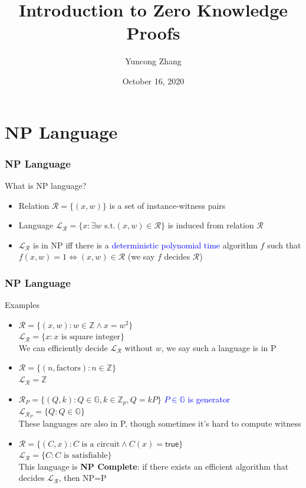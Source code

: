 \documentclass[handout]{beamer} %
\title{Introduction to Zero Knowledge Proofs}
\author{Yuncong Zhang}
\date{October 16, 2020}
\newcommand{\blue}[1]{\textcolor{blue}{#1}}
\newcommand{\dgreen}[1]{\textcolor{dgreen}{#1}}
\begin{document}
\frame{\titlepage}

\section[Outline]{}

\section{NP Language}
\frame
{
  \frametitle{NP Language}
  \onslide<+-> What is NP language?
  \begin{itemize}
    \item<+-> Relation $\mathcal{R}=\{(x,w)\}$ is a set of instance-witness pairs
    \item<+-> Language $\mathcal{L}_\mathcal{R}=\{x:\exists w \text{ s.t.} (x,w)\in\mathcal{R}\}$ is induced from relation $\mathcal{R}$
    \item<+-> $\mathcal{L}_{\mathcal{R}}$ is in NP iff there is a \blue{deterministic polynomial time} algorithm $f$ such that $f(x,w)=1\Leftrightarrow (x,w)\in\mathcal{R}$ (we say $f$ decides $\mathcal{R}$)
  \end{itemize}
}
{
  \frametitle{NP Language}
  \onslide<+-> Examples
  \begin{itemize}
    \item<+-> $\mathcal{R}=\{(x,w):w\in\mathbb{Z}\wedge x=w^2\}$\\
    $\mathcal{L}_{\mathcal{R}}=\{x:x\text{ is square integer}\}$\\
    \onslide<+-> \dgreen{We can efficiently decide $\mathcal{L}_{\mathcal{R}}$ without $w$, we say such a language is in P}
    \item<+-> $\mathcal{R}=\{(n,\text{factors}):n\in\mathbb{Z}\}$\\
    $\mathcal{L}_{\mathcal{R}}=\mathbb{Z}$
    \item<+-> $\mathcal{R}_P=\{(Q,k):Q\in\mathbb{G},k\in\mathbb{Z}_p, Q=kP\}$ \blue{$P\in\mathbb{G}$ is generator}\\
    $\mathcal{L}_{\mathcal{R}_P}=\{Q:Q\in\mathbb{G}\}$\\
    \onslide<+-> \dgreen{These languages are also in P, though sometimes it's hard to compute witness}
    \item<+-> $\mathcal{R}=\{(C,x):C\text{ is a circuit}\wedge C(x)=\mathsf{true}\}$\\
    $\mathcal{L}_{\mathcal{R}}=\{C:C\text{ is satisfiable}\}$\\
    \onslide<+-> \dgreen{This language is \textbf{NP Complete}: if there exists an efficient algorithm that decides $\mathcal{L}_{\mathcal{R}}$, then NP=P}
  \end{itemize}
}
\end{document}
